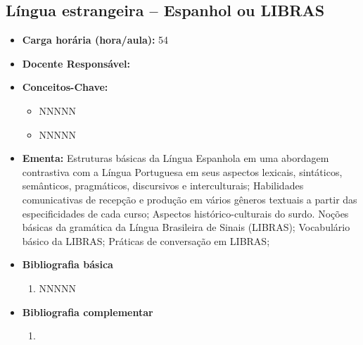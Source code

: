 \documentclass[11pt,fleqn]{book} %
\begin{document}
\subsection{Língua estrangeira – Espanhol ou LIBRAS}\label{disc:espanhol_libras}
\begin{itemize}
	\item \textbf{Carga horária (hora/aula):} 54
	\item \textbf{Docente Responsável:}
	\item \textbf{Conceitos-Chave:}
	\begin{itemize}
		\item NNNNN
		\item NNNNN
	\end{itemize}
	\item \textbf{Ementa:} Estruturas básicas da Língua Espanhola em uma abordagem contrastiva com a Língua Portuguesa em seus aspectos lexicais, sintáticos, semânticos, pragmáticos, discursivos e interculturais; 
	Habilidades comunicativas de recepção e produção em vários gêneros textuais a partir das especificidades de cada curso;
	Aspectos histórico-culturais do surdo. Noções básicas da gramática da Língua Brasileira de Sinais (LIBRAS);
	Vocabulário básico da LIBRAS;
	Práticas de conversação em LIBRAS;		
	\item \textbf{Bibliografia básica}
	\begin{enumerate}
		\item NNNNN
	\end{enumerate}
	\item \textbf{Bibliografia complementar}
	\begin{enumerate}
		\item 
	\end{enumerate}	
\end{itemize}


\newpage
\end{document}
